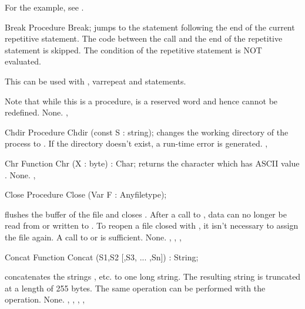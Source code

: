 \documentclass{report}
\begin{document}
For the example, see .

\begin{procedure}{Break}
\Declaration
Procedure Break;
\Description
{} jumps to the statement following the end of the current 
repetitive statement. The code between the  call and 
the end of the repetitive statement is skipped. 
The condition of the repetitive statement is NOT evaluated.

This can be used with , var{repeat} and  statements.

Note that while this is a procedure,  is a reserved word
and hence cannot be redefined.
\Errors
None.
\SeeAlso
{}, 
\end{procedure}


\begin{procedure}{Chdir}
\Declaration
Procedure Chdir (const S : string);
\Description
{} changes the working directory of the process to .
\Errors
If the directory  doesn't exist, a run-time error is generated.
\SeeAlso
{}, 
\end{procedure}


\begin{function}{Chr}
\Declaration
Function Chr (X : byte) : Char;
\Description
{} returns the character which has ASCII value .
\Errors
None.
\SeeAlso
{}, 
\end{function}


\begin{procedure}{Close}
\Declaration
Procedure Close (Var F : Anyfiletype);

\Description
{} flushes the buffer of the file  and closes .
After a call to , data can no longer be read from or written to
.
To reopen a file closed with , it isn't necessary to assign the
file again. A call to  or  is sufficient.
\Errors
None.
\SeeAlso
{}, , , 
\end{procedure}


\begin{function}{Concat}
\Declaration
Function Concat (S1,S2 [,S3, ... ,Sn]) : String;

\Description
{} concatenates the strings , etc. to one long
string. The resulting string is truncated at a length of 255 bytes.
The same operation can be performed with the \var{+} operation.
\Errors
None.
\SeeAlso
{}, , , , 
\end{function}
\end{document}
